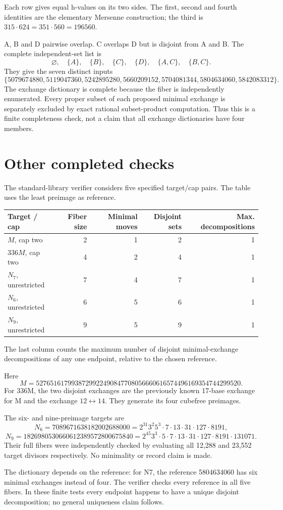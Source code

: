 Each row gives equal h-values on its two sides. The first, second and fourth identities are the elementary Mersenne construction; the third is \(315\cdot624=351\cdot560=196560\).

A, B and D pairwise overlap. C overlaps D but is disjoint from A and B. The complete independent-set list is \[
\varnothing,\quad\{A\},\quad\{B\},\quad\{C\},\quad\{D\},\quad\{A,C\},\quad\{B,C\}.
\] They give the seven distinct inputs \[
\{5079674880,5119047360,5242895280,5660209152,
5704081344,5804634060,5842083312\}.
\] The exchange dictionary is complete because the fiber is independently enumerated. Every proper subset of each proposed minimal exchange is separately excluded by exact rational subset-product computation. Thus this is a finite completeness check, not a claim that all exchange dictionaries have four members.

\section{Other completed checks}\label{exchange:other-completed-checks}

The standard-library verifier considers five specified target/cap pairs. The table uses the least preimage as reference.

\begin{center}
\small
\begin{tabular}{@{}lrrrr@{}}
\toprule
Target / cap & Fiber size & Minimal moves & Disjoint sets & Max. decompositions\\
\midrule
$M$, cap two & 2 & 1 & 2 & 1\\
$336M$, cap two & 4 & 2 & 4 & 1\\
$N_7$, unrestricted & 7 & 4 & 7 & 1\\
$N_6$, unrestricted & 6 & 5 & 6 & 1\\
$N_9$, unrestricted & 9 & 5 & 9 & 1\\
\bottomrule
\end{tabular}
\end{center}
The last column counts the maximum number of disjoint minimal-exchange decompositions
of any one endpoint, relative to the chosen reference.


Here \[
M=5276516179938729922490847708056660616574496169354744299520.
\] For 336M, the two disjoint exchanges are the previously known 17-base exchange for M and the exchange \(12\leftrightarrow14\). They generate its four cubefree preimages.

The six- and nine-preimage targets are \[
N_6=7089671638182002688000
=2^{31}3^2 5^3\cdot7\cdot13\cdot31\cdot127\cdot8191,
\] \[
N_9=1826980530660612389572800675840
=2^{45}3^3\cdot5\cdot7\cdot13\cdot31\cdot127\cdot8191\cdot131071.
\] Their full fibers were independently checked by evaluating all 12,288 and 23,552 target divisors respectively. No minimality or record claim is made.

The dictionary depends on the reference: for N7, the reference 5804634060 has six minimal exchanges instead of four. The verifier checks every reference in all five fibers. In these finite tests every endpoint happens to have a unique disjoint decomposition; no general uniqueness claim follows.
